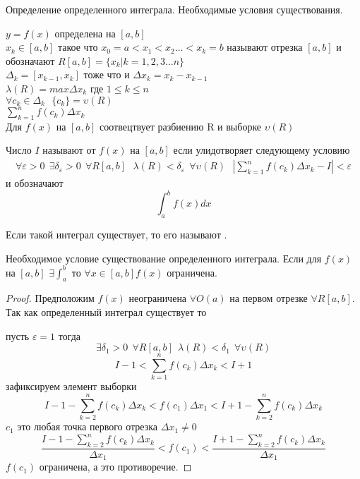 \begin{title}
  Определение определенного интеграла. Необходимые условия существования.
\end{title}

$y = f(x)$ определена на $[a,b]$\\
$x_k \in [a,b]$ такое что $x_0 = a < x_1 < x_2 \ldots < x_k = b$ называют
 отрезка $[a,b]$ и обозначают $R [a,b] =
\{x_k | k = 1,2,3 \ldots n\}$\\
$\Delta_k = [x_{k-1}, x_k]$ тоже что и $\Delta{x_k} = x_k - x_{k-1}$\\
$\lambda(R) = max\Delta x_k$ где $1 \le k \le n$ \\
$\forall c_k \in \Delta_k ~~~ \{c_k\} = \upsilon(R)$ \\
$\sum_{k=1}^{n} f(c_k)\Delta x_k$ \\

Для $f(x)$ на $[a,b]$ соотвецтвует разбиению R и выборке $\upsilon(R)$\\

\begin{defin}
  Число $I$ называют  от $f(x)$ на $[a,b]$ если
  улидотворяет следующему условию
  \begin{eqnarray*}
    \forall\varepsilon>0 ~~ \exists\delta_{\varepsilon}>0 ~~ \forall R[a,b] ~~~
    \lambda(R)<\delta_{\varepsilon} ~~ \forall\upsilon(R) ~~~
    \left| \sum_{k=1}^{n} f(c_k)\Delta x_k - I \right| < \varepsilon
  \end{eqnarray*}
   и обозначают
  $$\int_{a}^{b} f(x)dx$$

  Если такой интеграл существует, то его называют .
\end{defin}

\begin{theorem}
  Необходимое условие существование определенного интеграла. Если для $f(x)$
  на $[a,b]$ $\exists \int_{a}^{b}$ то $\forall x \in [a,b] f(x)$ ограничена.
\end{theorem}

\begin{proof}
  Предположим $f(x)$ неограничена $\forall O(a)$ на первом
  отрезке $\forall R[a,b]$. Так как определенный интеграл существует
  то

  пусть $\varepsilon = 1$ тогда \[\exists \delta_1 > 0 ~~ \forall R[a,b] ~~
  \lambda(R) < \delta_1 ~~ \forall \upsilon(R)\]
  \[I-1 < \sum_{k=1}^{n} f(c_k)\Delta x_k < I+1\] зафиксируем элемент выборки
  $$
  I - 1 - \sum_{k=2}^n f(c_k) \Delta x_k < f(c_1) \Delta x_1 <
  I + 1 - \sum_{k=2}^n f(c_k) \Delta x_k
  $$
  $c_1$ это любая точка первого отрезка $\Delta x_1 \not= 0$
  $$
  \frac{I-1 - \sum_{k=2}^n f(c_k) \Delta x_k}{\Delta x_1} <
  f(c_1) < \frac{I+1 - \sum_{k=2}^n f(c_k) \Delta x_k}{\Delta x_1}
  $$
  $f(c_1)$ ограничена, а это противоречие.
\end{proof}

